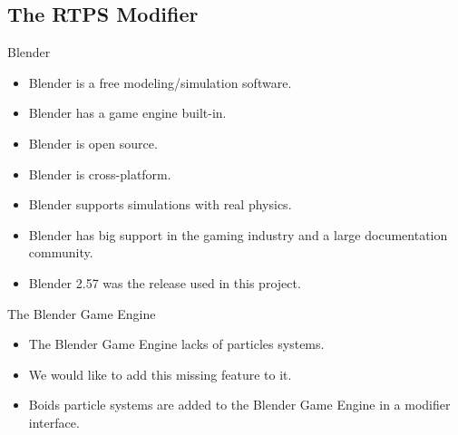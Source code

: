 \documentclass[red]{beamer}
\begin{document}
\subsection{The RTPS Modifier}

\begin{frame}{Blender}
	\begin{itemize}
		\pause \item Blender is a free modeling/simulation software.
		\pause \item Blender has a game engine built-in.
		\pause \item Blender is open source.
		\pause \item Blender is cross-platform.
		\pause \item Blender supports simulations with real physics.
		\pause \item Blender has big support in the gaming industry and a large documentation community.
		\pause \item Blender 2.57 was the release used in this project.
	\end{itemize}
\end{frame}

\begin{frame}{The Blender Game Engine}
	\begin{itemize}
		\pause \item The Blender Game Engine lacks of particles systems.
		\pause \item We would like to add this missing feature to it.
		\pause \item Boids particle systems are added to the Blender Game Engine in a modifier interface.
	\end{itemize}
\end{frame}
\end{document}
